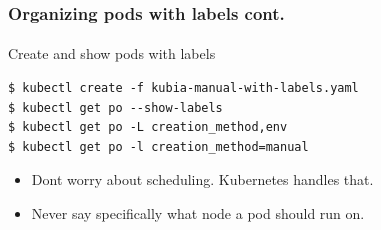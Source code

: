 
\begin{frame}[fragile]
	\frametitle{Organizing pods with labels cont.}
	\framesubtitle{}
	Create and show pods with labels
	\begin{lstlisting}[numbers=none, basicstyle=\ttfamily]
$ kubectl create -f kubia-manual-with-labels.yaml
$ kubectl get po --show-labels
$ kubectl get po -L creation_method,env
$ kubectl get po -l creation_method=manual
	\end{lstlisting}
	\begin{itemize}
		\item Dont worry about scheduling. Kubernetes handles that.
		\item Never say specifically what node a pod should run on.
	\end{itemize}
\end{frame}


